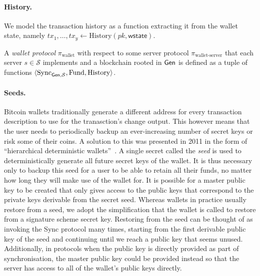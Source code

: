 \paragraph{History.}
We model the transaction history as a function extracting it from the wallet state, namely $tx_1, \dots, tx_y \gets \text{History}(pk, \textsf{wstate})$.

\begin{definition}
A \emph{wallet protocol} $\pi_\text{wallet}$ with respect to some server protocol $\pi_\text{wallet-server}$ that each server $s \in \mathcal{S}$ implements and a blockchain rooted in $\textsf{Gen}$ is defined as a tuple of functions $\langle\text{Sync}_{\textsf{Gen}, \mathcal{S}}, \text{Fund}, \text{History}\rangle$.
\end{definition}

\paragraph{Seeds.}
Bitcoin wallets traditionally generate a different address for every transaction description to use for the tranasction's change output. This however means that the user needs to periodically backup an ever-increasing number of secret keys or risk some of their coins. A solution to this was presented in 2011 in the form of ``hierarchical deterministic wallets''~\cite{first-deterministic,bip32}. A single secret called the \emph{seed} is used to deterministically generate all future secret keys of the wallet. It is thus necessary only to backup this seed for a user to be able to retain all their funds, no matter how long they will make use of the wallet for. It is possible for a master public key to be created that only gives access to the public keys that correspond to the private keys derivable from the secret seed. Whereas wallets in practice usually restore from a seed, we adopt the simplification that the wallet is called to restore from a signature scheme secret key. Restoring from the seed can be thought of as invoking the Sync protocol many times, starting from the first derivable public key of the seed and continuing until we reach a public key that seems unused. Additionally, in protocols when the public key is directly provided as part of synchronisation, the master public key could be provided instead so that the server has access to all of the wallet's public keys directly.
